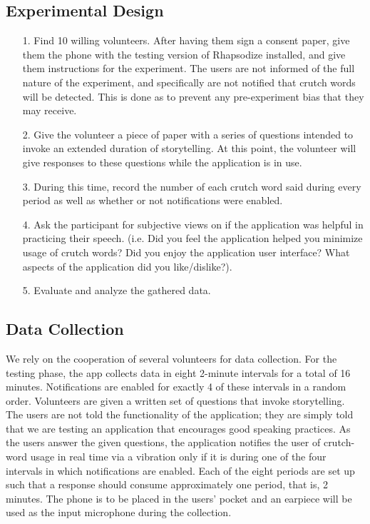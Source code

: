 \documentclass{sigchi}
\begin{document}
\subsection{Experimental Design}
\begin{itemize}
\item[1.] Find 10 willing volunteers. After having them sign a consent paper, give them the phone with the testing version of Rhapsodize installed, and give them instructions for the experiment. The users are not informed of the full nature of the experiment, and specifically are not notified that crutch words will be detected. This is done as to prevent any pre-experiment bias that they may receive.
\item[2.] Give the volunteer a piece of paper with a series of questions intended to invoke an extended duration of storytelling. At this point, the volunteer will give responses to these questions while the application is in use.
\item[3.] During this time, record the number of each crutch word said during every period as well as whether or not notifications were enabled.
\item[4.] Ask the participant for subjective views on if the application was helpful in practicing their speech. (i.e. Did you feel the application helped you minimize usage of crutch words? Did you enjoy the application user interface? What aspects of the application did you like/dislike?).
\item[5.] Evaluate and analyze the gathered data. 
\end{itemize}

\subsection{Data Collection}

We rely on the cooperation of several volunteers for data collection. For the testing phase, the app collects data in eight 2-minute intervals for a total of 16 minutes. Notifications are enabled for exactly 4 of these intervals in a random order. Volunteers are given a written set of questions that invoke storytelling. The users are not told the functionality of the application; they are simply told that we are testing an application that encourages good speaking practices. As the users answer the given questions, the application notifies the user of crutch-word usage in real time via a vibration only if it is during one of the four intervals in which notifications are enabled. Each of the eight periods are set up such that a response should consume approximately one period, that is, 2 minutes. The phone is to be placed in the users' pocket and an earpiece will be used as the input microphone during the collection.
\end{document}
